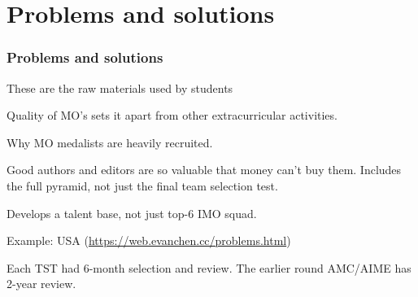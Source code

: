 \documentclass[10pt]{beamer}
\begin{document}
\section{Problems and solutions}
\begin{frame}
  \frametitle{Problems and solutions}
  \begin{block}{These are the raw materials used by students}
    \begin{itemize}
      \ii Quality of MO's sets it apart from other extracurricular activities.
      \begin{itemize}
        \ii Why MO medalists are heavily recruited.
      \end{itemize}
      \ii Good authors and editors are so valuable that money can't buy them.
      \ii Includes the full pyramid, not just the final team selection test.
      \begin{itemize}
        \ii Develops a talent base, not just top-6 IMO squad.
      \end{itemize}
    \end{itemize}
  \end{block}
  \pause
  \begin{exampleblock}{Example: USA {\footnotesize (\url{https://web.evanchen.cc/problems.html})}}
    \begin{itemize}
      \ii Each TST had \alert{6-month selection and review}.
      \ii The earlier round AMC/AIME has \alert{2-year review}.
    \end{itemize}
  \end{exampleblock}
\end{frame}
\end{document}
